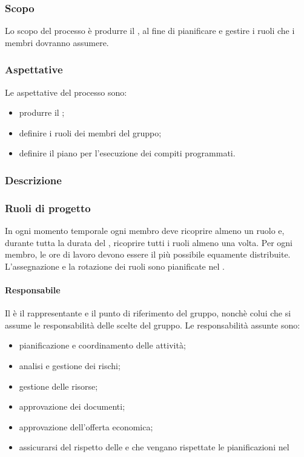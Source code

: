 \subsubsection{Scopo}
Lo scopo del processo è produrre il \PPdoc , al fine di pianificare e gestire i ruoli che i membri dovranno assumere.
\subsubsection{Aspettative}
Le aspettative del processo sono:
 \begin{itemize}
  \item produrre il \PPdoc ;
  \item definire i ruoli dei membri del gruppo;
  \item definire il piano per l'esecuzione dei compiti programmati.
 \end{itemize}
\subsubsection{Descrizione}
 
\subsubsection{Ruoli di progetto}
 In ogni momento temporale ogni membro deve ricoprire almeno un ruolo e, durante tutta la durata del , ricoprire tutti i ruoli almeno una volta. Per ogni membro, le ore di lavoro devono essere il più possibile equamente distribuite. L'assegnazione e la rotazione dei ruoli sono pianificate nel \PPdocRR.
 \paragraph{Responsabile}
 Il \RESP{} è il rappresentante e il punto di riferimento del gruppo, nonchè colui che si assume le responsabilità delle scelte del gruppo.
 Le responsabilità assunte sono:
 \begin{itemize}
  \item pianificazione e coordinamento delle attività;
  \item analisi e gestione dei rischi;
  \item gestione delle risorse;
  \item approvazione dei documenti;
  \item approvazione dell'offerta economica;
  \item assicurarsi del rispetto delle \NPdoc{} e che vengano rispettate le pianificazioni nel \PPdoc
 \end{itemize}
